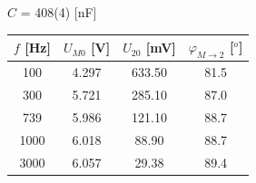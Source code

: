 \documentclass[a4paper,11pt]{article}
\begin{document}
\begin{minipage}[t]{0.5\textwidth}
\begin{center}
                    $C$ = 408(4) [nF]
                \end{center}
                \vspace{10pt}
                \par \centering
                \begin{tabular}{|c|c|c|c|}
                    \hline
                    $f$ [Hz] & $U_{M0}$ [V] & $U_{20}$ [mV] & $\varphi_{M\rightarrow 2}$ [$^o$] \\
                    \hline
                    100 & 4.297 & 633.50 & 81.5 \\
                    \hline
                    300 & 5.721 & 285.10 & 87.0 \\
                    \hline
                    739 & 5.986 & 121.10 & 88.7 \\
                    \hline
                    1000 & 6.018 & 88.90 & 88.7 \\
                    \hline
                    3000 & 6.057 & 29.38 & 89.4 \\
                    \hline
                \end{tabular}
                \captionsetup{justification=centering, font=footnotesize}
                \vspace{20pt}
                \raggedright
\end{minipage}
\newpage
\end{document}
